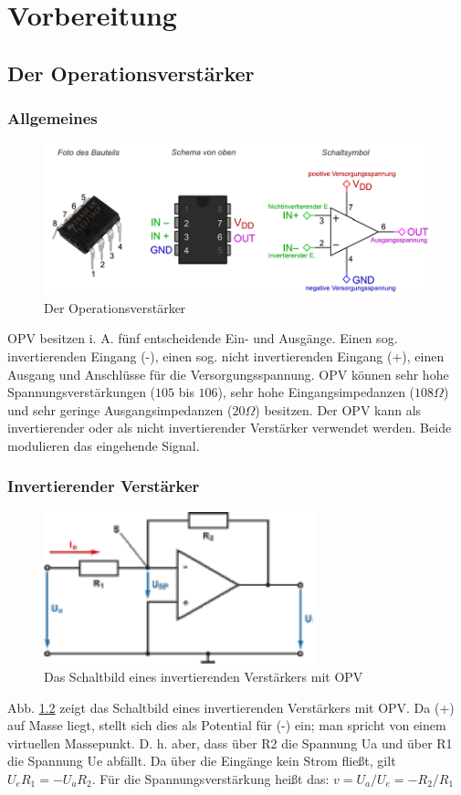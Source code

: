 \chapter{Vorbereitung}
\section{Der Operationsverstärker}
\subsection{Allgemeines}

\begin{figure}[H]
     \centering
     \includegraphics[width=1\textwidth]{Abb/opamp.pdf}
     \caption{Der Operationsverstärker}
     \label{opamp}
\end{figure}
OPV besitzen i. A. fünf entscheidende Ein- und Ausgänge. Einen sog. invertierenden Eingang (-), einen sog. nicht invertierenden Eingang (+), einen Ausgang und Anschlüsse für die Versorgungsspannung.
OPV können sehr hohe Spannungsverstärkungen ($105$ bis $106$), sehr hohe Eingangsimpedanzen ($108 \Omega$) und sehr geringe Ausgangsimpedanzen ($20 \Omega$) besitzen. 
Der OPV kann als invertierender oder als nicht invertierender Verstärker verwendet werden. Beide modulieren das eingehende Signal.

\subsection{Invertierender Verstärker}

\begin{figure}[H]
    \centering 
    \includegraphics[width=0.7\textwidth]{Abb/invamp.pdf}
    \caption{Das Schaltbild eines invertierenden Verstärkers mit OPV}
    \label{inv}
\end{figure}
Abb. \ref{inv} zeigt das Schaltbild eines invertierenden Verstärkers mit OPV. Da (+) auf Masse liegt, stellt sich dies als Potential für (-) ein; man spricht von einem virtuellen Massepunkt. D. h. aber, dass über R2 die Spannung Ua und über R1 die Spannung Ue abfällt. Da über die Eingänge kein Strom fließt, gilt $U_eR_1=-U_aR_2$. Für die Spannungsverstärkung heißt das:
$v= U_a/U_e =-R_2/R_1$

